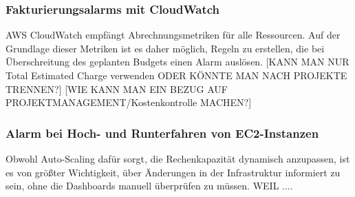 



\subsubsection{Fakturierungsalarms mit CloudWatch}
AWS CloudWatch empfängt Abrechnungsmetriken für alle Ressourcen. Auf der Grundlage dieser Metriken ist es daher möglich, Regeln zu erstellen, die bei Überschreitung des geplanten Budgets einen Alarm auslösen.
[KANN MAN NUR Total Estimated Charge verwenden ODER KÖNNTE MAN NACH PROJEKTE TRENNEN?]
[WIE KANN MAN EIN BEZUG AUF PROJEKTMANAGEMENT/Kostenkontrolle MACHEN?]

\subsubsection{Alarm bei Hoch- und Runterfahren von EC2-Instanzen}
Obwohl Auto-Scaling dafür sorgt, die Rechenkapazität dynamisch anzupassen, ist es von größter Wichtigkeit, über Änderungen in der Infrastruktur informiert zu sein, ohne die Dashboards manuell überprüfen zu müssen.
WEIL ....

